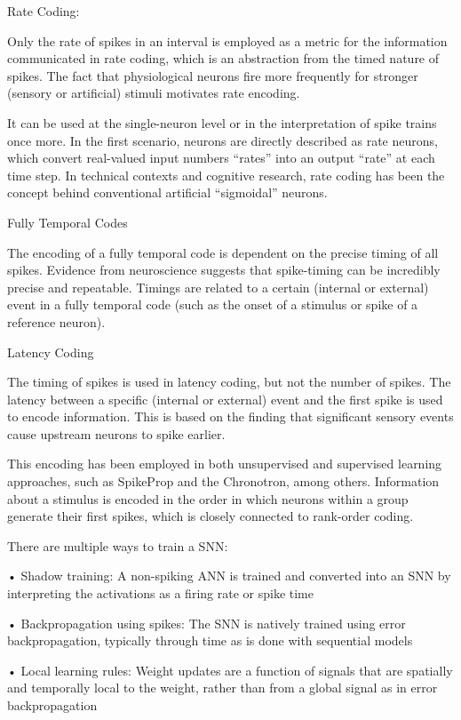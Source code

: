 \documentclass[11pt]{article}
\begin{document}
{  Rate Coding:

  Only the rate of spikes in an interval is employed as a metric for the information communicated in rate coding, which is an abstraction from the timed nature of spikes. The fact that physiological neurons fire more frequently for stronger (sensory or artificial) stimuli motivates rate encoding.

  It can be used at the single-neuron level or in the interpretation of spike trains once more. In the first scenario, neurons are directly described as rate neurons, which convert real-valued input numbers  “rates”  into an output “rate” at each time step. In technical contexts and cognitive research, rate coding has been the concept behind conventional artificial “sigmoidal” neurons.

  Fully Temporal Codes

  The encoding of a fully temporal code is dependent on the precise timing of all spikes. Evidence from neuroscience suggests that spike-timing can be incredibly precise and repeatable. Timings are related to a certain (internal or external) event in a fully temporal code (such as the onset of a stimulus or spike of a reference neuron).

  Latency Coding

  The timing of spikes is used in latency coding, but not the number of spikes. The latency between a specific (internal or external) event and the first spike is used to encode information. This is based on the finding that significant sensory events cause upstream neurons to spike earlier.

  This encoding has been employed in both unsupervised and supervised learning approaches, such as SpikeProp and the Chronotron, among others. Information about a stimulus is encoded in the order in which neurons within a group generate their first spikes, which is closely connected to rank-order coding.
}

There are multiple ways to train a SNN:

• Shadow training: A non-spiking ANN is trained and converted into an SNN by interpreting the activations as
a firing rate or spike time

• Backpropagation using spikes: The SNN is natively trained using error backpropagation, typically through
time as is done with sequential models

• Local learning rules: Weight updates are a function of signals that are spatially and temporally local to the
weight, rather than from a global signal as in error backpropagation
\end{document}
